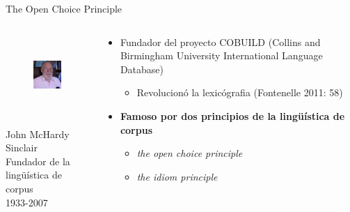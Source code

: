 \documentclass{beamer}
\begin{document}
\begin{frame}{The Open Choice Principle}
	\begin{columns}
    	\begin{column}{6cm}
        	\begin{figure}
    		\includegraphics[height=3cm]{sinclair.jpg}
       		\end{figure}
            \begin{center}
			\begin{tiny}
            John McHardy Sinclair \\
			Fundador de la lingüística de corpus \\
			1933-2007\\
            \end{tiny}
			\end{center}
        \end{column}
        \begin{column}{6cm}
        	\begin{itemize}
         
                \item Fundador del proyecto COBUILD (Collins and Birmingham University International Language Database)
                \begin{itemize}
                	
                    \item Revolucionó la lexicógrafia (Fontenelle 2011: 58)
                \end{itemize}
       
                \item \textbf{Famoso por dos principios de la lingüística de corpus}
                \begin{itemize}
                	
                    \item \textit{the open choice principle}
                    \item \textit{the idiom principle}
                \end{itemize}
            \end{itemize}
        \end{column}
    \end{columns}
\end{frame}
\end{document}
